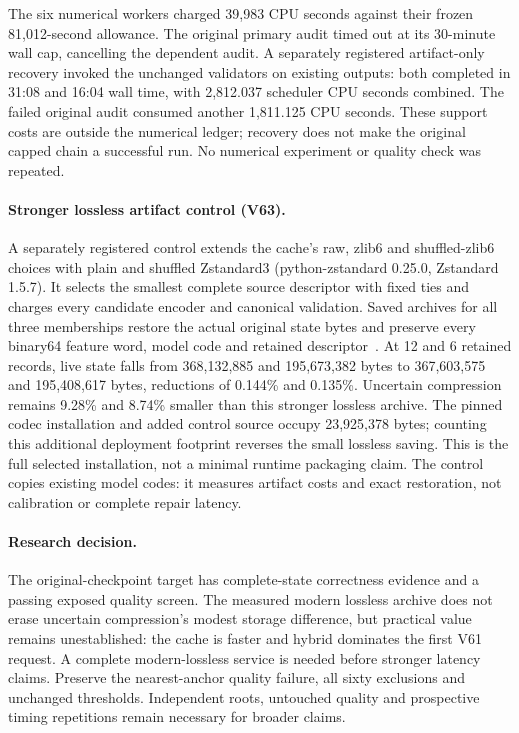 \documentclass[10pt,twocolumn,letterpaper]{article}
\begin{document}
The six numerical workers charged 39,983 CPU seconds against their frozen
81,012-second allowance. The original primary audit timed out at its 30-minute
wall cap, cancelling the dependent audit. A separately registered artifact-only
recovery invoked the unchanged validators on existing outputs: both completed
in 31:08 and 16:04 wall time, with 2,812.037 scheduler CPU seconds combined.
The failed original audit consumed another 1,811.125 CPU seconds. These support
costs are outside the numerical ledger; recovery does not make the original
capped chain a successful run. No numerical experiment or quality check was repeated.

\paragraph{Stronger lossless artifact control (V63).}
A separately registered control extends the cache's raw, zlib6 and shuffled-zlib6
choices with plain and shuffled Zstandard3 (python-zstandard 0.25.0, Zstandard
1.5.7). It selects the smallest complete source descriptor with fixed ties and
charges every candidate encoder and canonical validation. Saved archives for all
three memberships restore the actual original state bytes and preserve every
binary64 feature word, model code and retained descriptor~\cite{v63terminal}.
At 12 and 6 retained records, live state falls from 368,132,885 and 195,673,382
bytes to 367,603,575 and 195,408,617 bytes, reductions of 0.144\% and 0.135\%.
Uncertain compression remains 9.28\% and 8.74\% smaller than this stronger
lossless archive. The pinned codec installation and added control source occupy
23,925,378 bytes; counting this additional deployment footprint reverses the
small lossless saving. This is the full selected installation, not a minimal
runtime packaging claim. The control copies existing model codes: it measures
artifact costs and exact restoration, not calibration or complete repair latency.

\paragraph{Research decision.}
The original-checkpoint target has complete-state correctness evidence and a
passing exposed quality screen. The measured modern lossless archive does not
erase uncertain compression's modest storage difference, but practical value
remains unestablished: the cache is faster and hybrid dominates the first V61
request. A complete modern-lossless service is needed before stronger latency
claims. Preserve the nearest-anchor quality failure, all sixty exclusions and
unchanged thresholds. Independent roots, untouched quality and prospective
timing repetitions remain necessary for broader claims.
\end{document}

